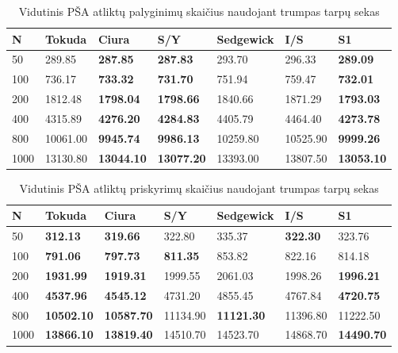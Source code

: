 \documentclass{VUMIFInfKursinis}
\begin{document}
\begin{table}[H]
  \caption{Vidutinis PŠA atliktų palyginimų skaičius naudojant trumpas tarpų sekas}
  \label{iss_small_comparisons}
  \begin{tabular}{|l|l|l|l|l|l|l|}
  \hline
  N    & Tokuda   & Ciura             & S/Y               & Sedgewick & I/S      & S1                \\ \hline
  50   & 289.85   & \textbf{287.85}   & \textbf{287.83}   & 293.70    & 296.33   & \textbf{289.09}   \\ \hline
  100  & 736.17   & \textbf{733.32}   & \textbf{731.70}   & 751.94    & 759.47   & \textbf{732.01}   \\ \hline
  200  & 1812.48  & \textbf{1798.04}  & \textbf{1798.66}  & 1840.66   & 1871.29  & \textbf{1793.03}  \\ \hline
  400  & 4315.89  & \textbf{4276.20}  & \textbf{4284.83}  & 4405.79   & 4464.40  & \textbf{4273.78}  \\ \hline
  800  & 10061.00 & \textbf{9945.74}  & \textbf{9986.13}  & 10259.80  & 10525.90 & \textbf{9999.26}  \\ \hline
  1000 & 13130.80 & \textbf{13044.10} & \textbf{13077.20} & 13393.00  & 13807.50 & \textbf{13053.10} \\ \hline
  \end{tabular}
  \end{table}

\begin{table}[H]
  \caption{Vidutinis PŠA atliktų priskyrimų skaičius naudojant trumpas tarpų sekas}
  \label{iss_small_assignments}
  \begin{tabular}{|l|l|l|l|l|l|l|}
  \hline
  N    & Tokuda            & Ciura             & S/Y             & Sedgewick         & I/S             & S1                \\ \hline
  50   & \textbf{312.13}   & \textbf{319.66}   & 322.80          & 335.37            & \textbf{322.30} & 323.76            \\ \hline
  100  & \textbf{791.06}   & \textbf{797.73}   & \textbf{811.35} & 853.82            & 822.16          & 814.18            \\ \hline
  200  & \textbf{1931.99}  & \textbf{1919.31}  & 1999.55         & 2061.03           & 1998.26         & \textbf{1996.21}  \\ \hline
  400  & \textbf{4537.96}  & \textbf{4545.12}  & 4731.20         & 4855.45           & 4767.84         & \textbf{4720.75}  \\ \hline
  800  & \textbf{10502.10} & \textbf{10587.70} & 11134.90        & \textbf{11121.30} & 11396.80        & 11222.50          \\ \hline
  1000 & \textbf{13866.10} & \textbf{13819.40} & 14510.70        & 14523.70          & 14868.70        & \textbf{14490.70} \\ \hline
  \end{tabular}
  \end{table}
\end{document}
